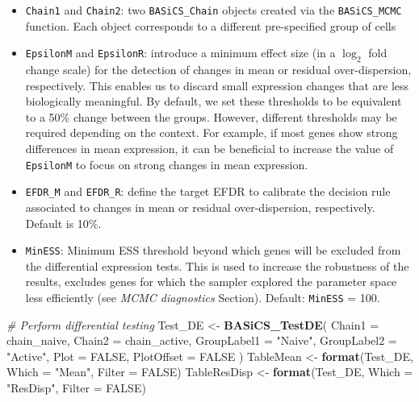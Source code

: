 \documentclass[9pt,a4paper,]{extarticle}
\newenvironment{Shaded}{\begin{snugshade}}{\end{snugshade}}
\newcommand{\CommentTok}[1]{\textcolor[rgb]{0.56,0.35,0.01}{\textit{#1}}}
\newcommand{\DataTypeTok}[1]{\textcolor[rgb]{0.13,0.29,0.53}{#1}}
\newcommand{\KeywordTok}[1]{\textcolor[rgb]{0.13,0.29,0.53}{\textbf{#1}}}
\newcommand{\NormalTok}[1]{#1}
\newcommand{\OtherTok}[1]{\textcolor[rgb]{0.56,0.35,0.01}{#1}}
\newcommand{\StringTok}[1]{\textcolor[rgb]{0.31,0.60,0.02}{#1}}
\begin{document}
\begin{itemize}
\item
  \texttt{Chain1} and \texttt{Chain2}: two \texttt{BASiCS\_Chain} objects created via the \texttt{BASiCS\_MCMC}
  function. Each object corresponds to a different pre-specified group of cells
\item
  \texttt{EpsilonM} and \texttt{EpsilonR}: introduce a minimum effect size (in a
  \(\log_2\) fold change scale) for the detection of changes in mean or residual
  over-dispersion, respectively.
  This enables us to discard small expression changes that are less biologically
  meaningful.
  By default, we set these thresholds to be equivalent to a 50\% change between
  the groups.
  However, different thresholds may be required depending on the context.
  For example, if most genes show strong differences in mean expression, it can be
  beneficial to increase the value of \texttt{EpsilonM} to focus on strong changes in
  mean expression.
\item
  \texttt{EFDR\_M} and \texttt{EFDR\_R}: define the target EFDR to calibrate the
  decision rule associated to changes in mean or residual over-dispersion,
  respectively. Default is 10\%.\\
\item
  \texttt{MinESS}: Minimum ESS threshold beyond which genes will be excluded from the
  differential expression tests.
  This is used to increase the robustness of the results, excludes genes for which
  the sampler explored the parameter space less efficiently (see
  \emph{MCMC diagnostics} Section). Default: \texttt{MinESS} = 100.
\end{itemize}

\begin{Shaded}
\begin{Highlighting}[]
\CommentTok{# Perform differential testing}
\NormalTok{Test_DE <-}\StringTok{ }\KeywordTok{BASiCS_TestDE}\NormalTok{(}
  \DataTypeTok{Chain1 =}\NormalTok{ chain_naive,}
  \DataTypeTok{Chain2 =}\NormalTok{ chain_active,}
  \DataTypeTok{GroupLabel1 =} \StringTok{"Naive"}\NormalTok{,}
  \DataTypeTok{GroupLabel2 =} \StringTok{"Active"}\NormalTok{,}
  \DataTypeTok{Plot =} \OtherTok{FALSE}\NormalTok{,}
  \DataTypeTok{PlotOffset =} \OtherTok{FALSE}
\NormalTok{)}
\NormalTok{TableMean <-}\StringTok{ }\KeywordTok{format}\NormalTok{(Test_DE, }\DataTypeTok{Which =} \StringTok{"Mean"}\NormalTok{, }\DataTypeTok{Filter =} \OtherTok{FALSE}\NormalTok{)}
\NormalTok{TableResDisp <-}\StringTok{ }\KeywordTok{format}\NormalTok{(Test_DE, }\DataTypeTok{Which =} \StringTok{"ResDisp"}\NormalTok{, }\DataTypeTok{Filter =} \OtherTok{FALSE}\NormalTok{)}
\end{Highlighting}
\end{Shaded}
\end{document}
